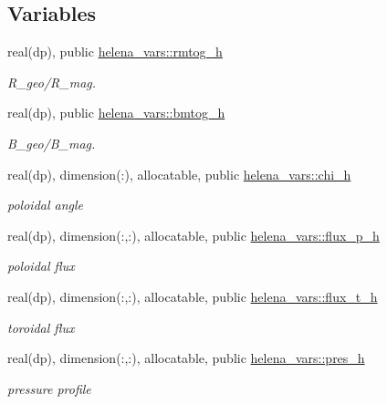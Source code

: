 \subsection*{Variables}
\begin{DoxyCompactItemize}
\item 
real(dp), public \hyperlink{namespacehelena__vars_ae7f70e6b0e2babde94c88cd5141a215e}{helena\+\_\+vars\+::rmtog\+\_\+h}
\begin{DoxyCompactList}\small\item\em R\+\_\+geo/\+R\+\_\+mag. \end{DoxyCompactList}\item 
real(dp), public \hyperlink{namespacehelena__vars_aab2e408c4a8677843633d486dc216dfe}{helena\+\_\+vars\+::bmtog\+\_\+h}
\begin{DoxyCompactList}\small\item\em B\+\_\+geo/\+B\+\_\+mag. \end{DoxyCompactList}\item 
real(dp), dimension(\+:), allocatable, public \hyperlink{namespacehelena__vars_aaaa83af362a93836b4dc74bdfa715d1a}{helena\+\_\+vars\+::chi\+\_\+h}
\begin{DoxyCompactList}\small\item\em poloidal angle \end{DoxyCompactList}\item 
real(dp), dimension(\+:,\+:), allocatable, public \hyperlink{namespacehelena__vars_ab84791cf288fa3209eafb797479d1e47}{helena\+\_\+vars\+::flux\+\_\+p\+\_\+h}
\begin{DoxyCompactList}\small\item\em poloidal flux \end{DoxyCompactList}\item 
real(dp), dimension(\+:,\+:), allocatable, public \hyperlink{namespacehelena__vars_af28db18d415da215cae4d9ec9f60e18b}{helena\+\_\+vars\+::flux\+\_\+t\+\_\+h}
\begin{DoxyCompactList}\small\item\em toroidal flux \end{DoxyCompactList}\item 
real(dp), dimension(\+:,\+:), allocatable, public \hyperlink{namespacehelena__vars_a3c258f679dc87684823f378abdc851f0}{helena\+\_\+vars\+::pres\+\_\+h}
\begin{DoxyCompactList}\small\item\em pressure profile \end{DoxyCompactList}\item 

\end{DoxyCompactItemize}
